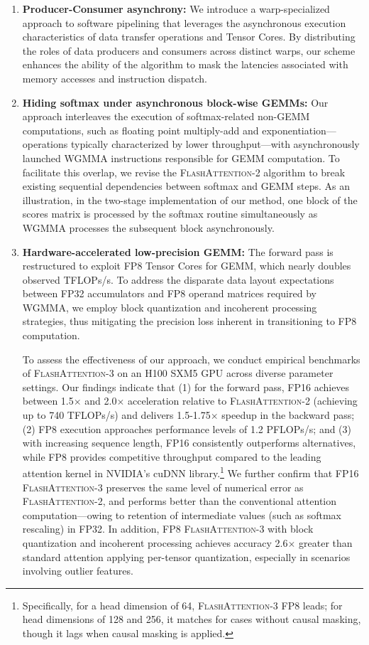 \begin{enumerate}

\item \textbf{Producer-Consumer asynchrony:} We introduce a warp-specialized approach to software pipelining that leverages the asynchronous execution characteristics of data transfer operations and Tensor Cores. By distributing the roles of data producers and consumers across distinct warps, our scheme enhances the ability of the algorithm to mask the latencies associated with memory accesses and instruction dispatch.
\item \textbf{Hiding softmax under asynchronous block-wise GEMMs:} Our approach interleaves the execution of softmax-related non-GEMM computations, such as floating point multiply-add and exponentiation—operations typically characterized by lower throughput—with asynchronously launched WGMMA instructions responsible for GEMM computation. To facilitate this overlap, we revise the \textsc{FlashAttention-2} algorithm to break existing sequential dependencies between softmax and GEMM steps. As an illustration, in the two-stage implementation of our method, one block of the scores matrix is processed by the softmax routine simultaneously as WGMMA processes the subsequent block asynchronously.
\item \textbf{Hardware-accelerated low-precision GEMM:} The forward pass is restructured to exploit FP8 Tensor Cores for GEMM, which nearly doubles observed TFLOPs/s. To address the disparate data layout expectations between FP32 accumulators and FP8 operand matrices required by WGMMA, we employ block quantization and incoherent processing strategies, thus mitigating the precision loss inherent in transitioning to FP8 computation.

To assess the effectiveness of our approach, we conduct empirical benchmarks of \textsc{FlashAttention-3} on an H100 SXM5 GPU across diverse parameter settings. Our findings indicate that (1) for the forward pass, FP16 achieves between 1.5$\times$ and 2.0$\times$ acceleration relative to \textsc{FlashAttention-2} (achieving up to 740 TFLOPs/s) and delivers 1.5-1.75$\times$ speedup in the backward pass; (2) FP8 execution approaches performance levels of 1.2 PFLOPs/s; and (3) with increasing sequence length, FP16 consistently outperforms alternatives, while FP8 provides competitive throughput compared to the leading attention kernel in NVIDIA's cuDNN library.\footnote{Specifically, for a head dimension of 64, \textsc{FlashAttention-3} FP8 leads; for head dimensions of 128 and 256, it matches for cases without causal masking, though it lags when causal masking is applied.} We further confirm that FP16 \textsc{FlashAttention-3} preserves the same level of numerical error as \textsc{FlashAttention-2}, and performs better than the conventional attention computation—owing to retention of intermediate values (such as softmax rescaling) in FP32. In addition, FP8 \textsc{FlashAttention-3} with block quantization and incoherent processing achieves accuracy 2.6$\times$ greater than standard attention applying per-tensor quantization, especially in scenarios involving outlier features.


\end{enumerate}
